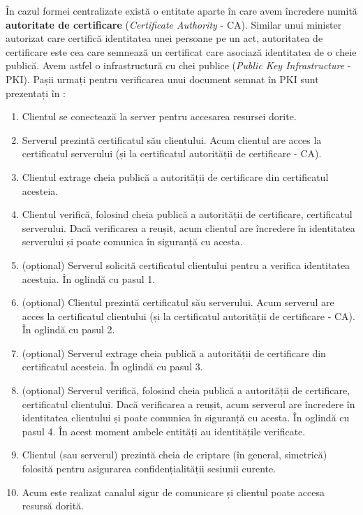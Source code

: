 În cazul formei centralizate există o entitate aparte în care avem încredere numită \textbf{autoritate de certificare} (\textit{Certificate Authority} - CA). Similar unui minister autorizat care certifică identitatea unei persoane pe un act, autoritatea de certificare este cea care semnează un certificat care asociază identitatea de o cheie publică. Avem astfel o infrastructură cu chei publice (\textit{Public Key Infrastructure} - PKI). Pașii urmați pentru verificarea unui document semnat în PKI sunt prezentați în :
\begin{enumerate}
  \item Clientul se conectează la server pentru accesarea resursei dorite.
  \item Serverul prezintă certificatul său clientului.
    Acum clientul are acces la certificatul serverului (și la certificatul autorității de certificare - CA).
  \item Clientul extrage cheia publică a autorității de certificare din certificatul acesteia.
  \item Clientul verifică, folosind cheia publică a autorității de certificare, certificatul serverului.
    Dacă verificarea a reușit, acum clientul are încredere în identitatea serverului și poate comunica în siguranță cu acesta.
  \item (opțional) Serverul solicită certificatul clientului pentru a verifica identitatea acestuia.
    În oglindă cu pasul 1.
  \item (opțional) Clientul prezintă certificatul său serverului.
    Acum serverul are acces la certificatul clientului (și la certificatul autorității de certificare - CA).
    În oglindă cu pasul 2.
  \item (opțional) Serverul extrage cheia publică a autorității de certificare din certificatul acesteia.
    În oglindă cu pasul 3.
  \item (opțional) Serverul verifică, folosind cheia publică a autorității de certificare, certificatul clientului.
    Dacă verificarea a reușit, acum serverul are încredere în identitatea clientului și poate comunica în siguranță cu acesta.
    În oglindă cu pasul 4.
    În acest moment ambele entități au identitățile verificate.
  \item Clientul (sau serverul) prezintă cheia de criptare (în general, simetrică) folosită pentru asigurarea confidențialității sesiunii curente.
  \item Acum este realizat canalul sigur de comunicare și clientul poate accesa resursă dorită.
\end{enumerate}

